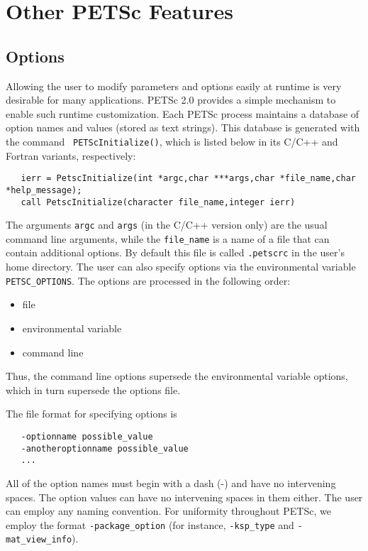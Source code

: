 \chapter{Other PETSc Features}

\section{Options}  
\label{sec:options}

Allowing the user to modify parameters and options easily at runtime
is very desirable for many applications. PETSc 2.0 provides a simple
mechanism to enable such runtime customization. Each PETSc process
maintains a database of option names and values (stored as text
strings). This database is generated with the command {\tt
PETScInitialize()}, which is listed below in its C/C++ and Fortran
variants, respectively:
\begin{verbatim}
   ierr = PetscInitialize(int *argc,char ***args,char *file_name,char *help_message);
   call PetscInitialize(character file_name,integer ierr)
\end{verbatim}
The arguments {\tt argc} and {\tt args} (in the C/C++ version only) are
the usual command line arguments, while the {\tt file\_name} is a name of
a file that can contain additional options. 
By default this file is called {\tt .petscrc}  in the 
user's home directory.  The user can also specify options via the
environmental variable {\tt PETSC\_OPTIONS}.   
The options are processed in the following order:
\begin{itemize}
\item file
\item environmental variable
\item command line
\end{itemize}
Thus, the command line options supersede the environmental variable
options, which in turn supersede the options file.

The file format for specifying options is 
\begin{verbatim}
   -optionname possible_value
   -anotheroptionname possible_value
   ...
\end{verbatim}
All of the option names must begin with a dash (-) and have no intervening 
spaces.  The option values can have no intervening spaces in them either.
The user can employ any naming convention.  For uniformity throughout
PETSc, we employ the format {\tt -package\_option} (for instance, 
{\tt -ksp\_type} and {\tt -mat\_view\_info}).

